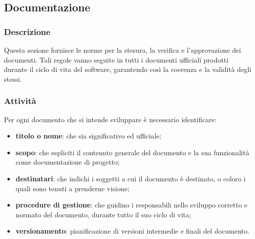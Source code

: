 \subsection{Documentazione}
    \subsubsection{Descrizione}
      Questa sezione fornisce le norme per la stesura, la verifica e l'approvazione dei documenti. Tali regole vanno seguite in tutti i documenti ufficiali prodotti durante il ciclo di vita del software, garantendo così la coerenza e la validità degli stessi.
      
	\subsubsection{Attività}
	  Per ogni documento che si intende sviluppare è necessario identificare:
	  \begin{itemize}
	  	\item \textbf{titolo o nome}: che sia significativo ed ufficiale;
	  	\item \textbf{scopo}: che espliciti il contenuto generale del documento e la sua funzionalità come documentazione di progetto;
	  	\item \textbf{destinatari}: che indichi i soggetti a cui il documento è destinato, o coloro i quali sono tenuti a prenderne visione;
	  	\item \textbf{procedure di gestione}: che guidino i responsabili nello sviluppo corretto e normato del documento, durante tutto il suo ciclo di vita;
	  	\item \textbf{versionamento}: pianificazione di versioni intermedie e finali del documento.
	  \end{itemize}
      
